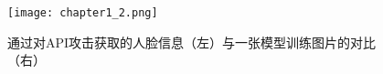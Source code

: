 \begin{figure}
  \centering
  \texttt{[image: chapter1\_2.png]}
  \caption{通过对API攻击获取的人脸信息（左）与一张模型训练图片的对比（右）\cite{10.1145/2810103.2813677}}
  \label{fig:chapter1_2}
\end{figure}


